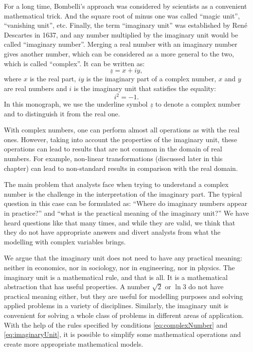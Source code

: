 \documentclass[
]{book}
\begin{document}
For a long time, Bombelli's approach was considered by scientists as a convenient mathematical trick. And the square root of minus one was called ``magic unit'', ``vanishing unit'', etc. Finally, the term ``imaginary unit'' was established by René Descartes in 1637, and any number multiplied by the imaginary unit would be called ``imaginary number''. Merging a real number with an imaginary number gives another number, which can be considered as a more general to the two, which is called ``complex''. It can be written as:
\begin{equation}
    \underline{z} = x+iy ,
    \label{eq:complexNumber}
\end{equation}
where \(x\) is the real part, \(iy\) is the imaginary part of a complex number, \(x\) and \(y\) are real numbers and \(i\) is the imaginary unit that satisfies the equality:
\begin{equation}
    i^2 = -1 .
    \label{eq:imaginaryUnit}
\end{equation}
In this monograph, we use the underline symbol \(\underline{z}\) to denote a complex number and to distinguish it from the real one.

With complex numbers, one can perform almost all operations as with the real ones. However, taking into account the properties of the imaginary unit, these operations can lead to results that are not common in the domain of real numbers. For example, non-linear transformations (discussed later in this chapter) can lead to non-standard results in comparison with the real domain.

The main problem that analysts face when trying to understand a complex number is the challenge in the interpretation of the imaginary part. The typical question in this case can be formulated as: ``Where do imaginary numbers appear in practice?'' and ``what is the practical meaning of the imaginary unit?'' We have heard questions like that many times, and while they are valid, we think that they do not have appropriate answers and divert analysts from what the modelling with complex variables brings.

We argue that the imaginary unit does not need to have any practical meaning: neither in economics, nor in sociology, nor in engineering, nor in physics. The imaginary unit is a mathematical rule, and that is all. It is a mathematical abstraction that has useful properties. A number \(\sqrt{2}\) or \(\ln 3\) do not have practical meaning either, but they are useful for modelling purposes and solving applied problems in a variety of disciplines. Similarly, the imaginary unit is convenient for solving a whole class of problems in different areas of application. With the help of the rules specified by conditions \eqref{eq:complexNumber} and \eqref{eq:imaginaryUnit}, it is possible to simplify some mathematical operations and create more appropriate mathematical models.
\end{document}
